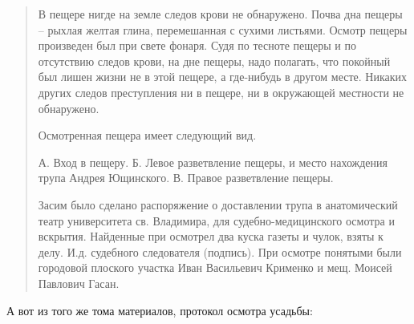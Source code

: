 \begin{quotation}
В пещере нигде на земле следов крови не обнаружено. Почва дна пещеры – рыхлая желтая глина, перемешанная с сухими листьями. Осмотр пещеры произведен был при свете фонаря. Судя по тесноте пещеры и по отсутствию следов крови, на дне пещеры, надо полагать, что покойный был лишен жизни не в этой пещере, а где-нибудь в другом месте. Никаких других следов преступления ни в пещере, ни в окружающей местности не обнаружено.

Осмотренная пещера имеет следующий вид.

А. Вход в пещеру. Б. Левое разветвление пещеры, и место нахождения трупа Андрея Ющинского. В. Правое разветвление пещеры.

Засим было сделано распоряжение о доставлении трупа в анатомический театр университета св. Владимира, для судебно-медицинского осмотра и вскрытия. Найденные при осмотрел два куска газеты и чулок, взяты к делу. И.д. судебного следователя (подпись). При осмотре понятыми были городовой плоского участка Иван Васильевич Крименко и мещ. Моисей Павлович Гасан.
\end{quotation}

А вот из того же тома материалов, протокол осмотра усадьбы:

